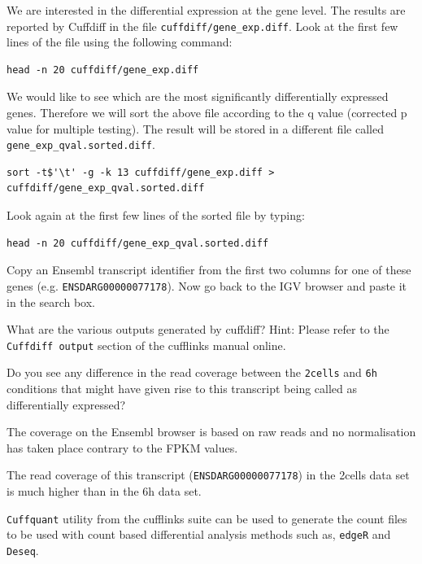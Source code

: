 \begin{steps}
We are interested in the differential expression at the gene level. The results
are reported by Cuffdiff in the file \texttt{cuffdiff/gene\_exp.diff}. 
Look at the first few lines of the file using the following command:
\begin{lstlisting}
head -n 20 cuffdiff/gene_exp.diff
\end{lstlisting}

We would like to see which are the most significantly differentially expressed
genes. Therefore we will sort the above file according to the q value
(corrected p value for multiple testing). The result will be stored in a
different file called \texttt{gene\_exp\_qval.sorted.diff}.
\begin{lstlisting}
sort -t$'\t' -g -k 13 cuffdiff/gene_exp.diff > cuffdiff/gene_exp_qval.sorted.diff
\end{lstlisting}

Look again at the first few lines of the sorted file by typing:
\begin{lstlisting}
head -n 20 cuffdiff/gene_exp_qval.sorted.diff
\end{lstlisting}

Copy an Ensembl transcript identifier from the first two columns for one of
these genes (e.g. \texttt{ENSDARG00000077178}). Now go back to the IGV browser
and paste it in the search box.
\end{steps}

\begin{questions}
What are the various outputs generated by cuffdiff?
Hint: Please refer to the \texttt{Cuffdiff output} section of the cufflinks manual online.

Do you see any difference in the read coverage between the \texttt{2cells} and
\texttt{6h} conditions that might have given rise to this transcript being
called as differentially expressed?
\begin{warning}
The coverage on the Ensembl browser is based on raw reads and no
normalisation has taken place contrary to the FPKM values.
\end{warning}

\begin{answer}
The read coverage of this transcript (\texttt{ENSDARG00000077178}) in the 2cells
data set is much higher than in the 6h data set.
\end{answer}
\end{questions}

\begin{information}
\texttt{Cuffquant} utility from the cufflinks suite can be used to generate the count
files to be used with count based differential analysis methods such as,
\texttt{edgeR} and \texttt{Deseq}.
\end{information}


